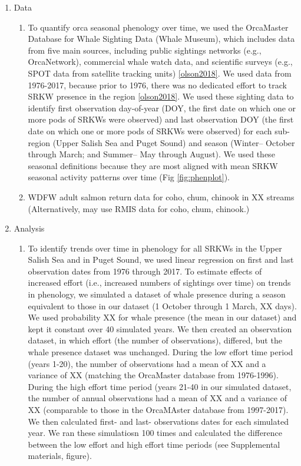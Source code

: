 \documentclass{article}
\begin{document}
\begin{enumerate}
\item Data
\begin{enumerate}
\item To quantify orca seasonal phenology over time, we used the OrcaMaster Database for Whale Sighting Data (Whale Museum), which includes data from five main sources, including public sightings networks (e.g., OrcaNetwork), commercial whale watch data, and scientific surveys (e.g., SPOT data from satellite tracking units) \ref{olson2018}. We used data from 1976-2017, because prior to 1976, there was no dedicated effort to track SRKW presence in the region \ref{olson2018}. We used these sighting data to identify first observation day-of-year (DOY, the first date on which one or more pods of SRKWs were observed) and last observation DOY (the first date on which one or more pods of SRKWs were observed) for each sub-region (Upper Salish Sea and Puget Sound) and season (Winter-- October through March; and Summer-- May through August). We used these seasonal definitions because they are most aligned with mean SRKW seasonal activity patterns over time (Fig \ref{fig:phenplot}).
\item WDFW adult salmon return data for coho, chum, chinook in XX streams (Alternatively, may use RMIS data for coho, chum, chinook.)
\end{enumerate}
\item Analysis
\begin{enumerate}
\item To identify trends over time in phenology for all SRKWs in the Upper Salish Sea and in Puget Sound, we used linear regression on first  and last observation dates from 1976 through 2017. To estimate effects of increased effort (i.e., increased numbers of sightings over time) on trends in phenology, we simulated a dataset of whale presence during a season equivalent to those in our dataset (1 October through 1 March, XX days). We used probability XX for whale presence (the mean in our dataset) and kept it constant over 40 simulated years. We then created an observation dataset, in which effort (the number of observations), differed, but the whale presence dataset was unchanged. During the low effort time period (years 1-20), the number of observations had a mean of XX and a variance of XX (matching the OrcaMaster database from 1976-1996).  During the high effort time period (years 21-40 in our simulated dataset, the number of annual observations had a mean of XX and a variance of XX (comparable to those in the OrcaMAster database from 1997-2017). We then calculated first- and last- observations dates for each simulated year. We ran these simulatiosn 100 times and calculated the difference between the low effort and high effort time periods (see Supplemental materials, figure).


\end{enumerate}
\end{enumerate}
\end{document}
